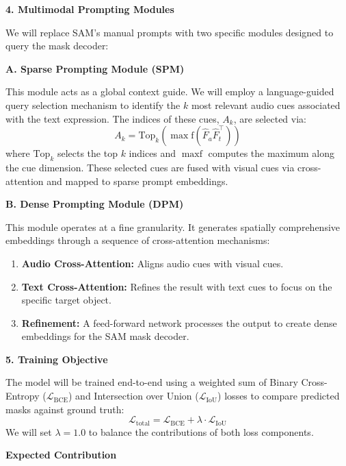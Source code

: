 \vspace{0.5em}
\noindent\textbf{4. Multimodal Prompting Modules}

We will replace SAM's manual prompts with two specific modules designed to query the mask decoder:

\vspace{0.25em}
\noindent\textbf{A. Sparse Prompting Module (SPM)}

This module acts as a global context guide. We will employ a language-guided query selection mechanism to identify the $k$ most relevant audio cues associated with the text expression. The indices of these cues, $A_{k}$, are selected via:
\[ A_{k} = \mathrm{Top}_{k} \left( \operatorname*{max} \mathrm{f} (\hat{F}_{a} \hat{F}_{t}^{\top}) \right) \]
where $\mathrm{Top}_{k}$ selects the top $k$ indices and $\operatorname{maxf}$ computes the maximum along the cue dimension. These selected cues are fused with visual cues via cross-attention and mapped to sparse prompt embeddings.

\vspace{0.25em}
\noindent\textbf{B. Dense Prompting Module (DPM)}

This module operates at a fine granularity. It generates spatially comprehensive embeddings through a sequence of cross-attention mechanisms:
\begin{enumerate}
    \item \textbf{Audio Cross-Attention:} Aligns audio cues with visual cues.
    \item \textbf{Text Cross-Attention:} Refines the result with text cues to focus on the specific target object.
    \item \textbf{Refinement:} A feed-forward network processes the output to create dense embeddings for the SAM mask decoder.
\end{enumerate}

\vspace{0.5em}
\noindent\textbf{5. Training Objective}

The model will be trained end-to-end using a weighted sum of Binary Cross-Entropy ($\mathcal{L}_{\mathrm{BCE}}$) and Intersection over Union ($\mathcal{L}_{\mathrm{IoU}}$) losses to compare predicted masks against ground truth:
\[ \mathcal{L}_{\mathrm{total}} = \mathcal{L}_{\mathrm{BCE}} + \lambda \cdot \mathcal{L}_{\mathrm{IoU}} \]
We will set $\lambda = 1.0$ to balance the contributions of both loss components.

\vspace{1em}
\noindent\textbf{Expected Contribution}

